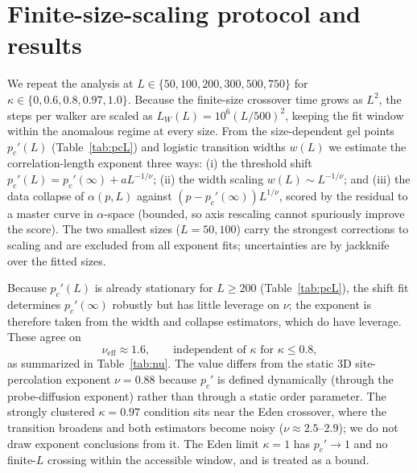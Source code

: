 \documentclass[aps,prl,onecolumn,superscriptaddress,nofootinbib]{revtex4-2}
\newcommand{\pcp}{p_c'}
\newcommand{\kap}{\kappa}
\newcommand{\nueff}{\nu_{\mathrm{eff}}}
\begin{document}
\section{Finite-size-scaling protocol and results}
We repeat the analysis at $L\in\{50,100,200,300,500,750\}$ for
$\kap\in\{0,0.6,0.8,0.97,1.0\}$. Because the finite-size crossover time grows as $L^2$, the steps
per walker are scaled as $L_W(L)=10^6(L/500)^2$, keeping the fit window within the anomalous
regime at every size. From the size-dependent gel points $\pcp(L)$ (Table~\ref{tab:pcL}) and
logistic transition widths $w(L)$ we estimate the correlation-length exponent three ways:
(i) the threshold shift $\pcp(L)=\pcp(\infty)+aL^{-1/\nu}$; (ii) the width scaling
$w(L)\sim L^{-1/\nu}$; and (iii) the data collapse of $\alpha(p,L)$ against
$(p-\pcp(\infty))L^{1/\nu}$, scored by the residual to a master curve in $\alpha$-space (bounded,
so axis rescaling cannot spuriously improve the score). The two smallest sizes ($L=50,100$)
carry the strongest corrections to scaling and are excluded from all exponent fits; uncertainties
are by jackknife over the fitted sizes.

Because $\pcp(L)$ is already stationary for $L\ge200$ (Table~\ref{tab:pcL}), the shift fit
determines $\pcp(\infty)$ robustly but has little leverage on $\nu$; the exponent is therefore
taken from the width and collapse estimators, which do have leverage. These agree on
\begin{equation}
  \nueff\approx1.6, \qquad \text{independent of } \kap \text{ for } \kap\le0.8,
\end{equation}
as summarized in Table~\ref{tab:nu}. The value differs from the static 3D site-percolation
exponent $\nu=0.88$ because $\pcp$ is defined dynamically (through the probe-diffusion exponent)
rather than through a static order parameter. The strongly clustered $\kap=0.97$ condition sits
near the Eden crossover, where the transition broadens and both estimators become noisy
($\nu\approx2.5$--$2.9$); we do not draw exponent conclusions from it. The Eden limit $\kap=1$
has $\pcp\to1$ and no finite-$L$ crossing within the accessible window, and is treated as a bound.
\end{document}
